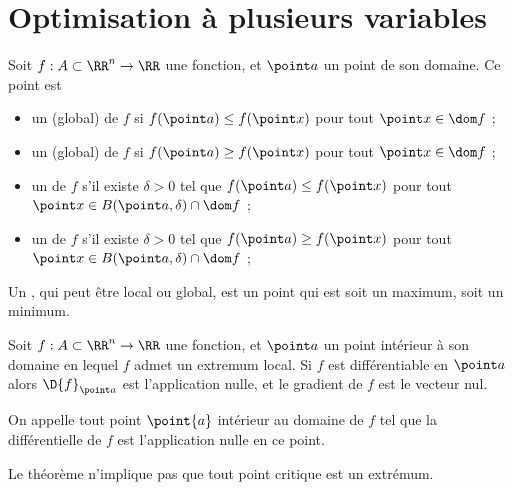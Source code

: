 \section{Optimisation à plusieurs variables}
\label{sec:optim-plus-vari}
\begin{frame}
  \begin{definition}\label{extremum}
    Soit \(f : A\subset \RR^n \to \RR\) une fonction, et \(\point a\) un point de son domaine.\pause{} Ce point est
    \begin{itemize}[<+->]
    \item un  (global) de \(f\) si \(f(\point a) \leq f(\point x)\) pour tout \(\point x \in \dom f\) ;
    \item un  (global) de \(f\) si \(f(\point a) \geq f(\point x)\) pour tout \(\point x \in \dom f\) ;
    \item un  de \(f\) s'il existe \(\delta > 0\) tel que \(f(\point a) \leq f(\point x)\) pour tout \(\point x \in B(\point a,\delta) \cap \dom f\) ;
    \item un  de \(f\) s'il existe \(\delta > 0\) tel que \(f(\point a) \geq f(\point x)\) pour tout \(\point x \in B(\point a,\delta) \cap \dom f\) ;
    \end{itemize}\pause{}
    Un \pause{}, qui peut être local ou global,\pause{} est un point qui est soit un maximum, soit un minimum.
  \end{definition}\pause{}
\end{frame}
\begin{frame}
  \begin{theorem}\label{extremaderivee}\pause{}
    Soit \(f : A\subset \RR^n \to \RR\) une fonction, et \(\point a\) un point intérieur à son domaine\pause{} en lequel \(f\) admet un extremum local.\pause{} Si \(f\) est différentiable en \(\point a\)\pause{} alors \(\D{f}_{\point a}\) est l'application nulle,\pause{} et le gradient de \(f\) est le vecteur nul.
  \end{theorem}\pause{}
  \begin{definition}
On appelle \pause{} tout point \(\point{a}\) intérieur au domaine de \(f\) tel que la différentielle de \(f\) est l'application nulle en ce point.
  \end{definition}\pause{}
  \begin{remark*}
    Le théorème n'implique pas que tout point critique est un extrémum.
  \end{remark*}
\end{frame}

